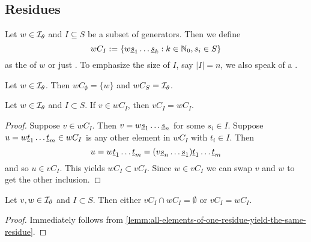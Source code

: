 \subsection{Residues}
\label{sec:twisted-involutions-residues}

\begin{defi}
	Let $w \in \mathcal{I}_{\theta}$ and $I \subseteq S$ be a subset of generators. Then we define
	$$ wC_I := \{ w \underline{s}_1 \ldots \underline{s}_k : k \in \mathbb{N}_0, s_i \in S \} $$
	as the  of $w$ or just . To emphasize the size of $I$, say $|I| = n$, we also speak of a .
\end{defi}

\begin{exam}
	Let $w \in \mathcal{I}_{\theta}$. Then $wC_\emptyset = \{ w \}$ and $wC_S = \mathcal{I}_{\theta}$.
\end{exam}

\begin{lemm}
	Let $w \in \mathcal{I}_{\theta}$ and $I \subset S$. If $v \in wC_I$, then $vC_I = wC_I$.

	\begin{proof}
		Suppose $v \in wC_I$. Then $v = w \underline{s}_1 \ldots \underline{s}_n$ for some $s_i \in I$. Suppose $u = w \underline{t}_1 \ldots \underline{t}_m \in wC_I$ is any other element in $wC_I$ with $t_i \in I$. Then
		$$ u = w \underline{t}_1 \ldots \underline{t}_m = (v \underline{s}_n \ldots \underline{s}_1) \underline{t}_1 \ldots \underline{t}_m $$
		and so $u \in vC_I$. This yields $wC_I \subset vC_I$. Since $w \in vC_I$ we can swap $v$ and $w$ to get the other inclusion.
	\end{proof}
\end{lemm}

\begin{coro}
	Let $v, w \in \mathcal{I}_{\theta}$ and $I \subset S$. Then either $vC_I \cap wC_I = \emptyset$ or $vC_I = wC_I$.

	\begin{proof}
		Immediately follows from \ref{lemm:all-elements-of-one-residue-yield-the-same-residue}.
	\end{proof}
\end{coro}

